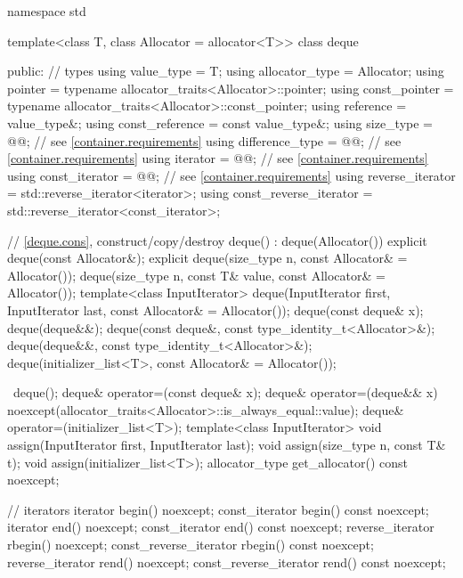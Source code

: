 \begin{codeblock}
namespace std {
  template<class T, class Allocator = allocator<T>>
  class deque {
  public:
    // types
    using value_type             = T;
    using allocator_type         = Allocator;
    using pointer                = typename allocator_traits<Allocator>::pointer;
    using const_pointer          = typename allocator_traits<Allocator>::const_pointer;
    using reference              = value_type&;
    using const_reference        = const value_type&;
    using size_type              = @@; // see \ref{container.requirements}
    using difference_type        = @@; // see \ref{container.requirements}
    using iterator               = @@; // see \ref{container.requirements}
    using const_iterator         = @@; // see \ref{container.requirements}
    using reverse_iterator       = std::reverse_iterator<iterator>;
    using const_reverse_iterator = std::reverse_iterator<const_iterator>;

    // \ref{deque.cons}, construct/copy/destroy
    deque() : deque(Allocator()) { }
    explicit deque(const Allocator&);
    explicit deque(size_type n, const Allocator& = Allocator());
    deque(size_type n, const T& value, const Allocator& = Allocator());
    template<class InputIterator>
      deque(InputIterator first, InputIterator last, const Allocator& = Allocator());
    deque(const deque& x);
    deque(deque&&);
    deque(const deque&, const type_identity_t<Allocator>&);
    deque(deque&&, const type_identity_t<Allocator>&);
    deque(initializer_list<T>, const Allocator& = Allocator());

    ~deque();
    deque& operator=(const deque& x);
    deque& operator=(deque&& x)
      noexcept(allocator_traits<Allocator>::is_always_equal::value);
    deque& operator=(initializer_list<T>);
    template<class InputIterator>
      void assign(InputIterator first, InputIterator last);
    void assign(size_type n, const T& t);
    void assign(initializer_list<T>);
    allocator_type get_allocator() const noexcept;

    // iterators
    iterator               begin() noexcept;
    const_iterator         begin() const noexcept;
    iterator               end() noexcept;
    const_iterator         end() const noexcept;
    reverse_iterator       rbegin() noexcept;
    const_reverse_iterator rbegin() const noexcept;
    reverse_iterator       rend() noexcept;
    const_reverse_iterator rend() const noexcept;

}}
\end{codeblock}
